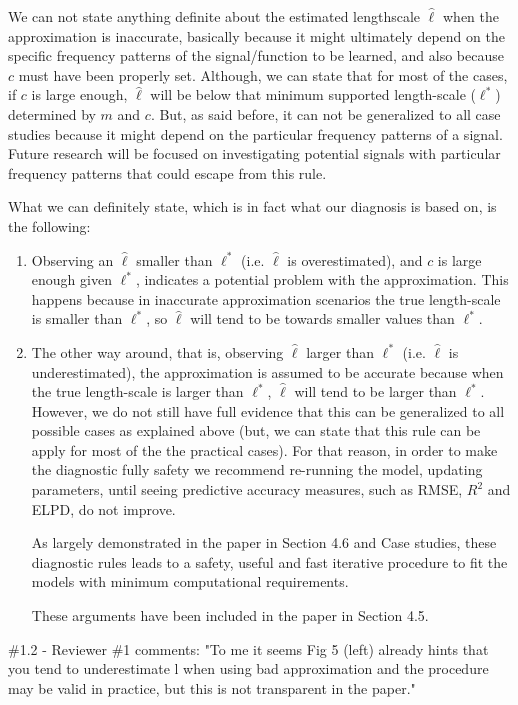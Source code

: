 \documentclass[11pt]{report}
\begin{document}
We can not state anything definite about the estimated lengthscale $\hat{\ell}$ when the approximation is inaccurate, basically because it might ultimately depend on the specific frequency patterns of the signal/function to be learned, and also because $c$ must have been properly set. Although, we can state that for most of the cases, if $c$ is large enough, $\hat{\ell}$ will be below that minimum supported length-scale ($\ell^*$) determined by $m$ and $c$. But, as said before, it can not be generalized to all case studies because it might depend on the particular frequency patterns of a signal. Future research will be focused on investigating potential signals with particular frequency patterns that could escape from this rule.

What we can definitely state, which is in fact what our diagnosis is based on, is the following:

\begin{enumerate}
\item  Observing an $\hat{\ell}$ smaller than $\ell^*$ (i.e. $\hat{\ell}$ is overestimated), and $c$ is large enough given $\ell^*$, indicates a potential problem with the approximation. This happens because in inaccurate approximation scenarios the true length-scale is smaller than $\ell^*$, so $\hat{\ell}$ will tend to be towards smaller values than $\ell^*$.

\item The other way around, that is, observing $\hat{\ell}$ larger than $\ell^*$ (i.e. $\hat{\ell}$ is underestimated), the approximation is assumed to be accurate because when the true length-scale is larger than $\ell^*$, $\hat{\ell}$ will tend to be larger than $\ell^*$. However, we do not still have full evidence that this can be generalized to all possible cases as explained above (but, we can state that this rule can be apply for most of the the practical cases). For that reason, in order to make the diagnostic fully safety we recommend re-running the model, updating parameters, until seeing predictive accuracy measures, such as RMSE, $R^2$ and ELPD, do not improve.

As largely demonstrated in the paper in Section 4.6 and Case studies, these diagnostic rules leads to a safety, useful and fast iterative procedure to fit the models with minimum computational requirements.

These arguments have been included in the paper in Section 4.5. 
\end{enumerate} 

\noindent \#1.2 - Reviewer \#1 comments: "To me it seems Fig 5 (left) already hints that you tend to underestimate l when using bad approximation and the procedure may be valid in practice, but this is not transparent in the paper."
\end{document}
